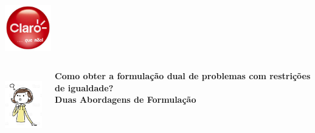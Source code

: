 \documentclass{beamer}
\begin{document}
\begin{frame}
\begin{columns}
\begin{column}{4cm}
{			}
			\only<3->
			{
				\includegraphics[width=2cm,height=2cm]{claroqnao.jpg}
			}
		\end{column}
	\end{columns}
	{
	\begin{columns}
		\centering
		\begin{column}{2cm}
			\includegraphics[width=2cm,height=3cm]{girldoubt.jpg}
		\end{column}
		\begin{column}{9cm}
			\Large {\textbf{Como obter a formulação dual de problemas com restrições de igualdade?}} \\
			\Large {\textbf{\color{red}Duas Abordagens de Formulação}}
		\end{column}
	\end{columns}
	}
\end{frame}
\end{document}
